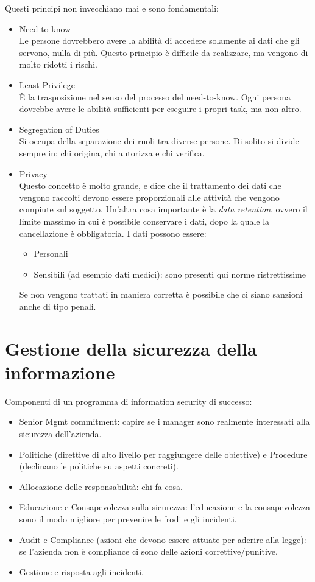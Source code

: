 Questi principi non invecchiano mai e sono fondamentali:
\begin{itemize}
  \item Need-to-know \\
  Le persone dovrebbero avere la abilità di accedere solamente ai dati che gli
  servono, nulla di più. Questo principio è difficile da realizzare, ma vengono
  di molto ridotti i rischi.
  \item Least Privilege \\
  È la trasposizione nel senso del processo del need-to-know. Ogni persona
  dovrebbe avere le abilità sufficienti per eseguire i propri task, ma non
  altro.
  \item Segregation of Duties \\
  Si occupa della separazione dei ruoli tra diverse persone. Di solito si
  divide sempre in: chi origina, chi autorizza e chi verifica.
  \item Privacy \\
  Questo concetto è molto grande, e dice che il trattamento dei dati che
  vengono raccolti devono essere proporzionali alle attività che vengono
  compiute sul soggetto. Un'altra cosa importante è la \textit{data retention},
  ovvero il limite massimo in cui è possibile conservare i dati, dopo la quale
  la cancellazione è obbligatoria. I dati possono essere:
  \begin{itemize}
    \item Personali
    \item Sensibili (ad esempio dati medici): sono presenti qui norme
    ristrettissime
  \end{itemize}
  Se non vengono trattati in maniera corretta è possibile che ci siano sanzioni
  anche di tipo penali.
\end{itemize}

\section{Gestione della sicurezza della informazione}

Componenti di un programma di information security di successo:

\begin{itemize}
\item  Senior Mgmt commitment: capire se i manager sono realmente interessati
alla sicurezza dell'azienda.
\item Politiche (direttive di alto livello per raggiungere delle obiettive) e
Procedure (declinano le politiche su aspetti concreti).
\item Allocazione delle responsabilità: chi fa cosa.
\item Educazione e Consapevolezza sulla sicurezza: l'educazione e la
consapevolezza sono il modo migliore per prevenire le frodi e gli incidenti.
\item Audit e Compliance (azioni che devono essere attuate per aderire alla
legge): se l'azienda non è compliance ci sono delle azioni correttive/punitive.
\item Gestione e risposta agli incidenti.
\end{itemize}

